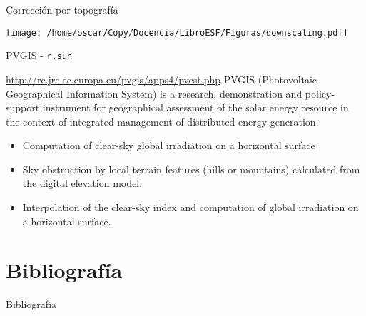 \documentclass[xcolor={usenames,svgnames,dvipsnames}]{beamer}
\begin{document}
\begin{frame}[label=sec-6-4]{Corrección por topografía}
\begin{center}
\texttt{[image: /home/oscar/Copy/Docencia/LibroESF/Figuras/downscaling.pdf]}
\end{center}

\nocite{Bosch.Batlles.ea2010}
\nocite{Tovar-Pescador.Pozo-Vazquez.ea2006}
\nocite{Antonanzas-Torres.MartinezdePison.ea2013}
\nocite{Hofierka.Suri2002}
\end{frame}
\begin{frame}[fragile,label=sec-6-5]{PVGIS - \texttt{r.sun}}
 \begin{block}{\url{http://re.jrc.ec.europa.eu/pvgis/apps4/pvest.php}}
PVGIS (Photovoltaic Geographical Information System) is a research,
demonstration and policy-support instrument for geographical
assessment of the solar energy resource in the context of integrated
management of distributed energy generation.
\begin{itemize}
\item Computation of clear-sky global irradiation on a horizontal surface
\item Sky obstruction by local terrain features (hills or mountains)
calculated from the digital elevation model.
\item Interpolation of the clear-sky index and computation of global
irradiation on a horizontal surface.
\end{itemize}
\end{block}
\end{frame}

\section{Bibliografía}
\label{sec-7}

\begin{frame}[allowframebreaks,label=]{Bibliografía}

\end{frame}
\end{document}
